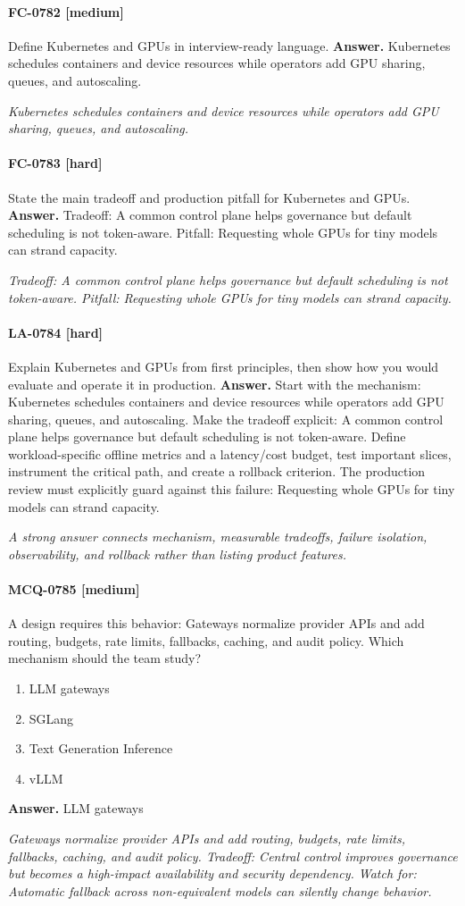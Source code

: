 \paragraph{FC-0782 [medium]} Define Kubernetes and GPUs in interview-ready language.
\noindent\textbf{Answer.} Kubernetes schedules containers and device resources while operators add GPU sharing, queues, and autoscaling.
\par\textit{Kubernetes schedules containers and device resources while operators add GPU sharing, queues, and autoscaling.}
\paragraph{FC-0783 [hard]} State the main tradeoff and production pitfall for Kubernetes and GPUs.
\noindent\textbf{Answer.} Tradeoff: A common control plane helps governance but default scheduling is not token-aware. Pitfall: Requesting whole GPUs for tiny models can strand capacity.
\par\textit{Tradeoff: A common control plane helps governance but default scheduling is not token-aware. Pitfall: Requesting whole GPUs for tiny models can strand capacity.}
\paragraph{LA-0784 [hard]} Explain Kubernetes and GPUs from first principles, then show how you would evaluate and operate it in production.
\noindent\textbf{Answer.} Start with the mechanism: Kubernetes schedules containers and device resources while operators add GPU sharing, queues, and autoscaling. Make the tradeoff explicit: A common control plane helps governance but default scheduling is not token-aware. Define workload-specific offline metrics and a latency/cost budget, test important slices, instrument the critical path, and create a rollback criterion. The production review must explicitly guard against this failure: Requesting whole GPUs for tiny models can strand capacity.
\par\textit{A strong answer connects mechanism, measurable tradeoffs, failure isolation, observability, and rollback rather than listing product features.}
\paragraph{MCQ-0785 [medium]} A design requires this behavior: Gateways normalize provider APIs and add routing, budgets, rate limits, fallbacks, caching, and audit policy. Which mechanism should the team study?
\begin{enumerate}[label=\Alph*.]
\item LLM gateways
\item SGLang
\item Text Generation Inference
\item vLLM
\end{enumerate}
\noindent\textbf{Answer.} LLM gateways
\par\textit{Gateways normalize provider APIs and add routing, budgets, rate limits, fallbacks, caching, and audit policy. Tradeoff: Central control improves governance but becomes a high-impact availability and security dependency. Watch for: Automatic fallback across non-equivalent models can silently change behavior.}
